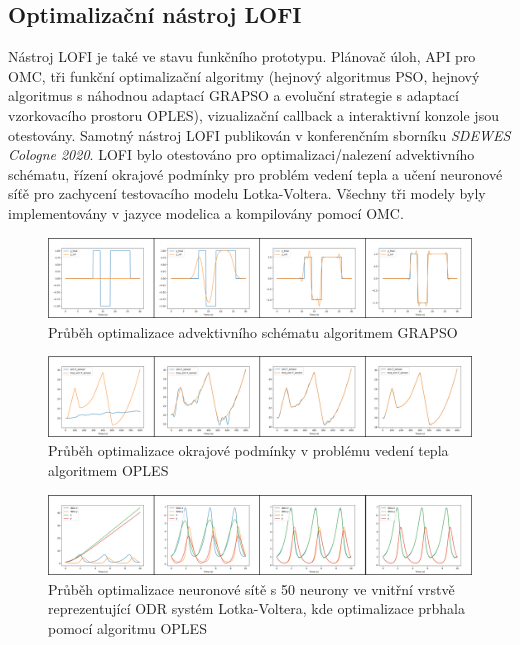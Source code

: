 \subsection*{Optimalizační nástroj LOFI}
Nástroj LOFI je také ve stavu funkčního prototypu. Plánovač úloh, API pro OMC,
tři funkční optimalizační algoritmy (hejnový algoritmus PSO, hejnový algoritmus s
náhodnou adaptací GRAPSO a evoluční strategie s adaptací vzorkovacího prostoru
OPLES), vizualizační callback a interaktivní konzole jsou otestovány. Samotný
nástroj LOFI  publikován v konferenčním sborníku
\textit{SDEWES Cologne 2020}. LOFI bylo otestováno pro optimalizaci/nalezení
advektivního schématu, řízení okrajové podmínky pro problém vedení tepla a
učení neuronové síťě pro zachycení testovacího modelu Lotka-Voltera. Všechny
tři modely byly implementovány v jazyce modelica a kompilovány pomocí OMC. 
\begin{figure}[h]
\begin{center}
  \includegraphics[width=\textwidth]{figures/Advection_GRAPSO}
\end{center}
\caption{Průběh optimalizace advektivního schématu algoritmem GRAPSO}
\label{fig:Advection_GRAPSO}
\end{figure}
\begin{figure}[h]
\begin{center}
  \includegraphics[width=\textwidth]{figures/Inverse_OPLES}
\end{center}
\caption{Průběh optimalizace okrajové podmínky v problému vedení tepla
algoritmem OPLES}
\label{fig:Advection_GRAPSO}
\end{figure}
\begin{figure}[h]
\begin{center}
  \includegraphics[width=\textwidth]{figures/LotkaVoltera_NN_OPLES}
\end{center}
\caption{Průběh optimalizace neuronové sítě s 50 neurony ve vnitřní vrstvě
reprezentující ODR systém Lotka-Voltera, kde optimalizace prbhala pomocí algoritmu OPLES}
\label{fig:Advection_GRAPSO}
\end{figure}

